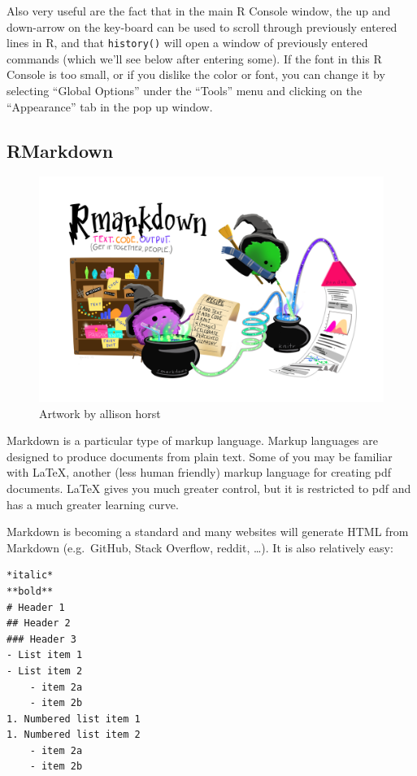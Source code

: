 \documentclass[
]{book}
\begin{document}
Also very useful are the fact that in the main R Console window, the up and down-arrow on the key-board can be used to scroll through previously entered lines in R, and that \texttt{history()} will open a window of previously entered commands (which we'll see below after entering some). If the font in this R Console is too small, or if you dislike the color or font, you can change it by selecting ``Global Options'' under the ``Tools'' menu and clicking on the ``Appearance'' tab in the pop up window.

\hypertarget{rmarkdown}{%
\subsection*{RMarkdown}\label{rmarkdown}}

\begin{figure}
\includegraphics[width=55.24in]{img/rmarkdown_wizards} \caption{Artwork by allison horst}\label{fig:unnamed-chunk-1}
\end{figure}

Markdown is a particular type of markup language. Markup languages are designed to produce documents from plain text. Some of you may be familiar with LaTeX, another (less human friendly) markup language for creating pdf documents. LaTeX gives you much greater control, but it is restricted to pdf and has a much greater learning curve.

Markdown is becoming a standard and many websites will generate HTML from Markdown (e.g.~GitHub, Stack Overflow, reddit, \ldots). It is also relatively easy:

\begin{verbatim}
*italic*
**bold**
# Header 1
## Header 2
### Header 3
- List item 1
- List item 2
    - item 2a
    - item 2b
1. Numbered list item 1
1. Numbered list item 2
    - item 2a
    - item 2b
\end{verbatim}
\end{document}
